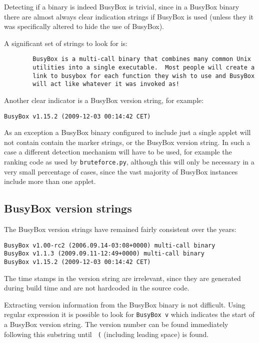 \documentclass[10pt]{article}
\begin{document}
Detecting if a binary is indeed BusyBox is trivial, since in a BusyBox binary
there are almost always clear indication strings if BusyBox is used (unless
they it was specifically altered to hide the use of BusyBox).

A significant set of strings to look for is:

\begin{verbatim}
        BusyBox is a multi-call binary that combines many common Unix
        utilities into a single executable.  Most people will create a
        link to busybox for each function they wish to use and BusyBox
        will act like whatever it was invoked as!
\end{verbatim}

Another clear indicator is a BusyBox version string, for example:

\begin{verbatim}
BusyBox v1.15.2 (2009-12-03 00:14:42 CET)
\end{verbatim}

As an exception a BusyBox binary configured to include just a single applet
will not contain contain the marker strings, or the BusyBox version string. In
such a case a different detection mechanism will have to be used, for example
the ranking code as used by \texttt{bruteforce.py}, although this will only be
necessary in a very small percentage of cases, since the vast majority of
BusyBox instances include more than one applet.

\subsection{BusyBox version strings}

The BusyBox version strings have remained fairly consistent over the years:

\begin{verbatim}
BusyBox v1.00-rc2 (2006.09.14-03:08+0000) multi-call binary
BusyBox v1.1.3 (2009.09.11-12:49+0000) multi-call binary
BusyBox v1.15.2 (2009-12-03 00:14:42 CET)
\end{verbatim}

The time stamps in the version string are irrelevant, since they are generated
during build time and are not hardcoded in the source code.

Extracting version information from the BusyBox binary is not difficult.
Using regular expression it is possible to look for \texttt{BusyBox v} which
indicates the start of a BusyBox version string. The version number can be
found immediately following this substring until \texttt{ (} (including
leading space) is found.
\end{document}
